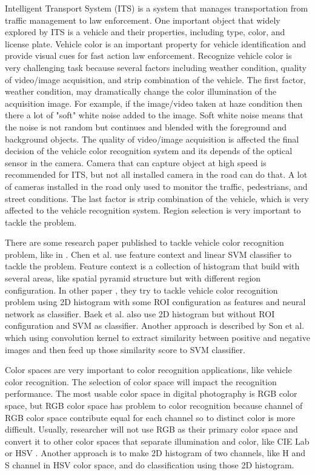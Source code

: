 \documentclass[conference]{IEEEtran}
\begin{document}
Intelligent Transport System (ITS) is a system that manages transportation from traffic management to law enforcement. One important object that widely explored by ITS is a vehicle and their properties, including type, color, and license plate. Vehicle color is an important property for vehicle identification and provide visual cues for fast action law enforcement. Recognize vehicle color is very challenging task because several factors including weather condition, quality of video/image acquisition, and strip combination of the vehicle. The first factor, weather condition, may dramatically change the color illumination of the acquisition image. For example, if the image/video taken at haze condition then there a lot of "soft" white noise added to the image. Soft white noise means that the noise is not random but continues and blended with the foreground and background objects. The quality of video/image acquisition is affected the final decision of the vehicle color recognition system and its depends of the optical sensor in the camera. Camera that can capture object at high speed is recommended for ITS, but not all installed camera in the road can do that. A lot of cameras installed in the road only used to monitor the traffic, pedestrians, and street conditions. The last factor is strip combination of the vehicle, which is very affected to the vehicle recognition system. Region selection is very important to tackle the problem.

There are some research paper published to tackle vehicle color recognition problem, like in \cite{hsieh,pchen,dule,baek,jwson}. Chen et al. \cite{pchen} use feature context and linear SVM classifier to tackle the problem. Feature context is a collection of histogram that build with several areas, like spatial pyramid structure but with different region configuration. In other paper \cite{dule}, they try to tackle vehicle color recognition problem using 2D histogram with some ROI configuration as features and neural network as classifier. Baek et al. \cite{baek} also use 2D histogram but without ROI configuration and SVM as classifier. Another approach is described by Son et al. \cite{jwson} which using convolution kernel to extract similarity between positive and negative images and then feed up those similarity score to SVM classifier.

Color spaces are very important to color recognition applications, like vehicle color recognition. The selection of color space will impact the recognition performance. The most usable color space in digital photography is RGB color space, but RGB color space has problem to color recognition because channel of RGB color space contribute equal for each channel so to distinct color is more difficult. Usually, researcher will not use RGB as their primary color space and convert it to other color spaces that separate illumination and color, like CIE Lab or HSV \cite{baek,dule,jwson}. Another approach is to make 2D histogram of two channels, like H and S channel in HSV color space, and do classification using those 2D histogram.
\end{document}
